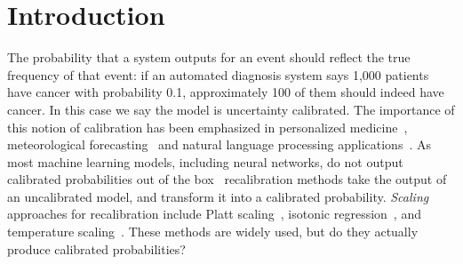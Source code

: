 \section{Introduction}

The probability that a system outputs for an event should reflect the true frequency of that event: if an automated diagnosis system says 1,000 patients have cancer with probability 0.1, approximately 100 of them should indeed have cancer.
In this case we say the model is uncertainty calibrated. The importance of this notion of calibration has been emphasized in personalized medicine~\cite{jiang2012calibrating}, meteorological forecasting~\cite{brocker2009decomposition} and natural language processing applications~\cite{nguyen2015posterior}.
As most machine learning models, including neural networks, do not output calibrated probabilities out of the box~\cite{guo2017calibration, zadrozny2001calibrated} recalibration methods take the output of an uncalibrated model, and transform it into a calibrated probability.
\emph{Scaling} approaches for recalibration include Platt scaling~\cite{platt1999probabilistic}, isotonic regression~\cite{zadrozny2002transforming}, and temperature scaling~\cite{guo2017calibration}. These methods are widely used, but do they actually produce calibrated probabilities?

